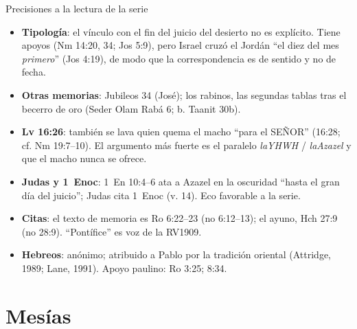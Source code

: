 \documentclass[hyperref={bookmarks=false},aspectratio=169]{beamer}
\newcommand{\SENOR}{S{\fontsize{0.78em}{1em}\selectfont EÑOR}}
\begin{document}
\begin{frame}{Precisiones a la lectura de la serie}
\scriptsize
\begin{itemize}\setlength{\itemsep}{2pt}
\item \textbf{Tipología}: el vínculo con el fin del juicio del desierto no es explícito. Tiene apoyos (Nm 14:20, 34; Jos 5:9), pero Israel cruzó el Jordán ``el diez del mes \emph{primero}'' (Jos 4:19), de modo que la correspondencia es de sentido y no de fecha.
\item \textbf{Otras memorias}: Jubileos 34 (José); los rabinos, las segundas tablas tras el becerro de oro (Seder Olam Rabá 6; b. Taanit 30b).
\item \textbf{Lv 16:26}: también se lava quien quema el macho ``para el \SENOR'' (16:28; cf. Nm 19:7--10). El argumento más fuerte es el paralelo \emph{laYHWH} / \emph{laAzazel} y que el macho nunca se ofrece.
\item \textbf{Judas y 1~Enoc}: 1~En 10:4--6 ata a Azazel en la oscuridad ``hasta el gran día del juicio''; Judas cita 1~Enoc (v. 14). Eco favorable a la serie.
\item \textbf{Citas}: el texto de memoria es Ro 6:22--23 (no 6:12--13); el ayuno, Hch 27:9 (no 28:9). ``Pontífice'' es voz de la RV1909.
\item \textbf{Hebreos}: anónimo; atribuido a Pablo por la tradición oriental (Attridge, 1989; Lane, 1991). Apoyo paulino: Ro 3:25; 8:34.
\end{itemize}
\end{frame}

\section{Mesías}
\end{document}
